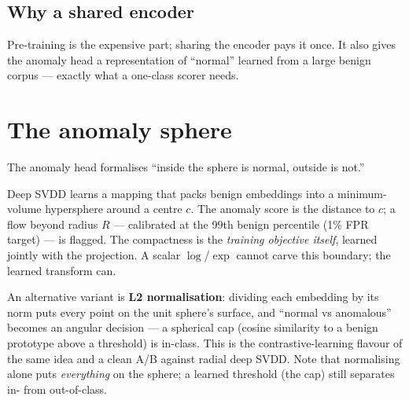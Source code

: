 \documentclass[11pt,a4paper]{article}
\begin{document}
\subsection{Why a shared encoder}
Pre-training is the expensive part; sharing the encoder pays it once. It also gives the anomaly head a representation of ``normal'' learned from a large benign corpus --- exactly what a one-class scorer needs.

\section{The anomaly sphere}

The anomaly head formalises ``inside the sphere is normal, outside is not.''

\begin{tcolorbox}[idea]
Deep SVDD learns a mapping that packs benign embeddings into a minimum-volume hypersphere around a centre $c$. The anomaly score is the distance to $c$; a flow beyond radius $R$ --- calibrated at the 99th benign percentile (1\% FPR target) --- is flagged. The compactness is the \emph{training objective itself}, learned jointly with the projection. A scalar $\log$/$\exp$ cannot carve this boundary; the learned transform can.
\end{tcolorbox}

An alternative variant is \textbf{L2 normalisation}: dividing each embedding by its norm puts every point on the unit sphere's surface, and ``normal vs anomalous'' becomes an angular decision --- a spherical cap (cosine similarity to a benign prototype above a threshold) is in-class. This is the contrastive-learning flavour of the same idea and a clean A/B against radial deep SVDD. Note that normalising alone puts \emph{everything} on the sphere; a learned threshold (the cap) still separates in- from out-of-class.
\end{document}
